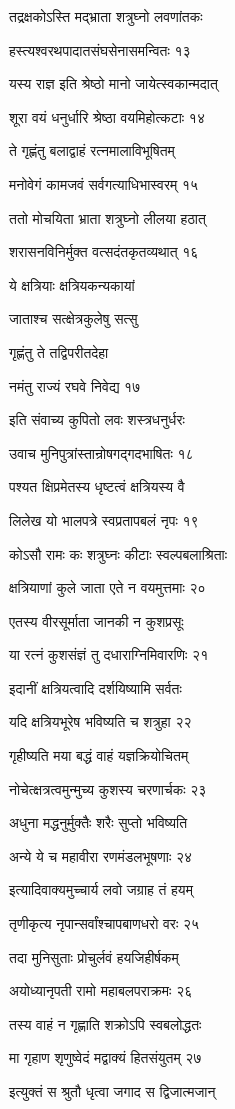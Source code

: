 तद्रक्षकोऽस्ति मद्भ्राता शत्रुघ्नो लवणांतकः

हस्त्यश्वरथपादातसंघसेनासमन्वितः १३

यस्य राज्ञ इति श्रेष्ठो मानो जायेत्स्वकान्मदात्

शूरा वयं धनुर्धारि श्रेष्ठा वयमिहोत्कटाः १४

ते गृह्णंतु बलाद्वाहं रत्नमालाविभूषितम्

मनोवेगं कामजवं सर्वगत्याधिभास्वरम् १५

ततो मोचयिता भ्राता शत्रुघ्नो लीलया हठात्

शरासनविनिर्मुक्त वत्सदंतकृतव्यथात् १६

ये क्षत्रियाः क्षत्रियकन्यकायां

जाताश्च सत्क्षेत्रकुलेषु सत्सु

गृह्णंतु ते तद्विपरीतदेहा

नमंतु राज्यं रघवे निवेद्य १७

इति संवाच्य कुपितो लवः शस्त्रधनुर्धरः

उवाच मुनिपुत्रांस्तान्रोषगद्गदभाषितः १८

पश्यत क्षिप्रमेतस्य धृष्टत्वं क्षत्रियस्य वै

लिलेख यो भालपत्रे स्वप्रतापबलं नृपः १९

कोऽसौ रामः कः शत्रुघ्नः कीटाः स्वल्पबलाश्रिताः

क्षत्रियाणां कुले जाता एते न वयमुत्तमाः २०

एतस्य वीरसूर्माता जानकी न कुशप्रसूः

या रत्नं कुशसंज्ञं तु दधाराग्निमिवारणिः २१

इदानीं क्षत्रियत्वादि दर्शयिष्यामि सर्वतः

यदि क्षत्रियभूरेष भविष्यति च शत्रुहा २२

गृहीष्यति मया बद्धं वाहं यज्ञक्रियोचितम्

नोचेत्क्षत्रत्वमुन्मुच्य कुशस्य चरणार्चकः २३

अधुना मद्धनुर्मुक्तैः शरैः सुप्तो भविष्यति

अन्ये ये च महावीरा रणमंडलभूषणाः २४

इत्यादिवाक्यमुच्चार्य लवो जग्राह तं हयम्

तृणीकृत्य नृपान्सर्वांश्चापबाणधरो वरः २५

तदा मुनिसुताः प्रोचुर्लवं हयजिहीर्षकम्

अयोध्यानृपती रामो महाबलपराक्रमः २६

तस्य वाहं न गृह्णाति शक्रोऽपि स्वबलोद्धतः

मा गृहाण शृणुष्वेदं मद्वाक्यं हितसंयुतम् २७

इत्युक्तं स श्रुतौ धृत्वा जगाद स द्विजात्मजान्

